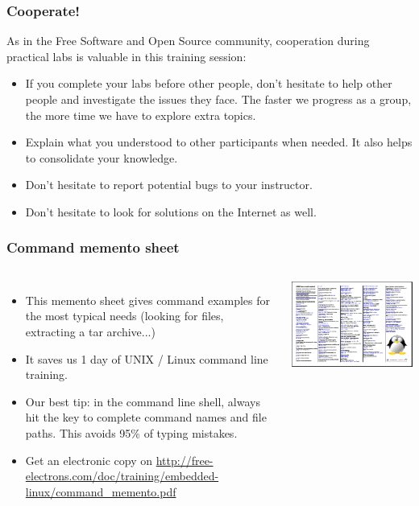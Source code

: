 \begin{frame}
\frametitle{Cooperate!}
As in the Free Software and Open Source community,
cooperation during practical labs is valuable in this training session:
\begin{itemize}
\item If you complete your labs before other people, don't hesitate to help
other people and investigate the issues they face. The faster we progress as a
group, the more time we have to explore extra topics.
\item Explain what you understood to other participants when needed.
It also helps to consolidate your knowledge.
\item Don't hesitate to report potential bugs to your instructor.
\item Don't hesitate to look for solutions on the Internet as well.
\end{itemize}
\end{frame}

\begin{frame}
  \frametitle{Command memento sheet}
  \begin{columns}
    \begin{itemize}
       \item This memento sheet gives command examples for the most
       typical needs (looking for files, extracting a tar archive...)
       \item It saves us 1 day of UNIX / Linux command line training.
       \item Our best tip: in the command line shell, always hit the
        key to complete command names and file paths.
       This avoids 95\% of typing mistakes.
       \item Get an electronic copy on
       \url{http://free-electrons.com/doc/training/embedded-linux/command_memento.pdf}
    \end{itemize}
    \includegraphics[width=\textwidth]{slides/course-information/command_memento.png}
  \end{columns}
\end{frame}

